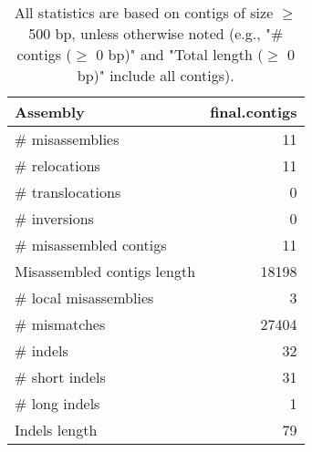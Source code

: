 \documentclass[12pt,a4paper]{article}
\begin{document}
\begin{table}[ht]
\begin{center}
\caption{All statistics are based on contigs of size $\geq$ 500 bp, unless otherwise noted (e.g., "\# contigs ($\geq$ 0 bp)" and "Total length ($\geq$ 0 bp)" include all contigs).}
\begin{tabular}{|l*{1}{|r}|}
\hline
Assembly & final.contigs \\ \hline
\# misassemblies & 11 \\ \hline
\hspace{5mm}\# relocations & 11 \\ \hline
\hspace{5mm}\# translocations & 0 \\ \hline
\hspace{5mm}\# inversions & 0 \\ \hline
\# misassembled contigs & 11 \\ \hline
Misassembled contigs length & 18198 \\ \hline
\# local misassemblies & 3 \\ \hline
\# mismatches & 27404 \\ \hline
\# indels & 32 \\ \hline
\hspace{5mm}\# short indels & 31 \\ \hline
\hspace{5mm}\# long indels & 1 \\ \hline
Indels length & 79 \\ \hline
\end{tabular}
\end{center}
\end{table}
\end{document}
